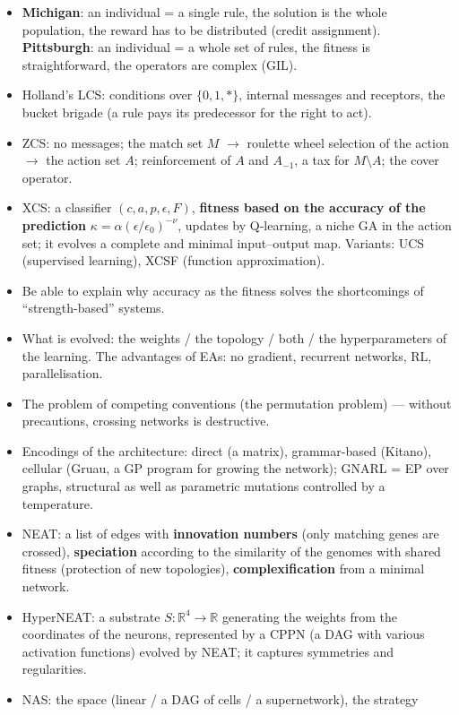 \documentclass[11pt,a4paper]{article}
\theoremstyle{definition}
\providecommand{\uv}[1]{``#1''}
\begin{document}
\begin{itemize}
\item \textbf{Michigan}: an individual = a single rule, the solution is the
  whole population, the reward has to be distributed (credit assignment).
  \textbf{Pittsburgh}: an individual = a whole set of rules, the fitness is
  straightforward, the operators are complex (GIL).
\item Holland's LCS: conditions over $\{0,1,*\}$, internal messages and
  receptors, the bucket brigade (a rule pays its predecessor for the right to
  act).
\item ZCS: no messages; the match set $M$ $\to$ roulette wheel selection of the
  action $\to$ the action set $A$; reinforcement of $A$ and $A_{-1}$, a tax for
  $M \setminus A$; the cover operator.
\item XCS: a classifier $(c,a,p,\epsilon,F)$, \textbf{fitness based on the
  accuracy of the prediction} $\kappa = \alpha(\epsilon/\epsilon_0)^{-\nu}$,
  updates by Q-learning, a niche GA in the action set; it evolves a complete and
  minimal input--output map. Variants: UCS (supervised learning), XCSF (function
  approximation).
\item Be able to explain why accuracy as the fitness solves the shortcomings of
  \uv{strength-based} systems.
\item What is evolved: the weights / the topology / both / the hyperparameters
  of the learning. The advantages of EAs: no gradient, recurrent networks, RL,
  parallelisation.
\item The problem of competing conventions (the permutation problem) --- without
  precautions, crossing networks is destructive.
\item Encodings of the architecture: direct (a matrix), grammar-based (Kitano),
  cellular (Gruau, a GP program for growing the network); GNARL = EP over
  graphs, structural as well as parametric mutations controlled by a
  temperature.
\item NEAT: a list of edges with \textbf{innovation numbers} (only matching
  genes are crossed), \textbf{speciation} according to the similarity of the
  genomes with shared fitness (protection of new topologies),
  \textbf{complexification} from a minimal network.
\item HyperNEAT: a substrate $S:\mathbb{R}^4 \to \mathbb{R}$ generating the
  weights from the coordinates of the neurons, represented by a CPPN (a DAG with
  various activation functions) evolved by NEAT; it captures symmetries and
  regularities.
\item NAS: the space (linear / a DAG of cells / a supernetwork), the strategy

\end{itemize}
\end{document}
